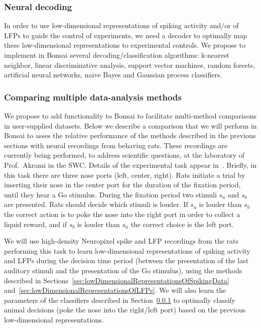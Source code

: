 \documentclass[a4paper,11point]{article}
\begin{document}
\subsubsection{Neural decoding}
\label{sec:neuralDecoding}

In order to use low-dimensional representations of spiking activity and/or of
LFPs to guide the control of experiments, we need a decoder to optimally map
these low-dimensional representations to experimental controls.
%
We propose to implement in Bonsai several decoding/classification algorithms:
k-nearest neighbor, linear discriminative analysis, support vector machines,
random forests, artificial neural networks, naive Bayes and Gaussian process
classifiers.

\subsubsection{Comparing multiple data-analysis methods}
\label{sec:comparisonOfMultipleMethods}

We propose to add functionality to Bonsai to facilitate multi-method
comparisons in user-supplied datasets. Below we describe a comparison that we
will perform in Bonsai to asses the relative performance of the methods
described in the previous sections with neural recordings from behaving rats.
These recordings are currently being performed, to address scientific questions,
at the laboratory of Prof.~Akrami in the SWC.
%
Details of the experimental task appear in~\citet{akramiEtAl18}.
%
Briefly, in this task there are three nose ports (left, center, right). Rats
initiate a trial by inserting their nose in the center port for the duration of
the fixation period, until they hear a Go stimulus. During the fixation period
two stimuli $s_a$ and $s_b$ are presented. Rats should decide which stimuli is
louder. If $s_a$ is louder than $s_b$ the correct action is to poke the nose
into the right port in order to collect a liquid reward, and if $s_b$ is louder
than $s_a$ the correct choice is the left port.

We will use high-density Neuropixel spike and LFP recordings from the rats
performing this task to learn low-dimensional representations of spiking
activity and LFPs during the decision time period (between the presentation of
the last auditory stimuli and the presentation of the Go stimulus), using the
methods described in
Sections~\ref{sec:lowDimensionalRepresentationsOfSpikingData}
and~\ref{sec:lowDimensionalRepresentationsOfLFPs}. We will also learn the
parameters of the classifiers described in Section~\ref{sec:neuralDecoding} to
optimally classify animal decisions (poke the nose into the right/left port)
based on the previous low-dimensional representations.
\end{document}
